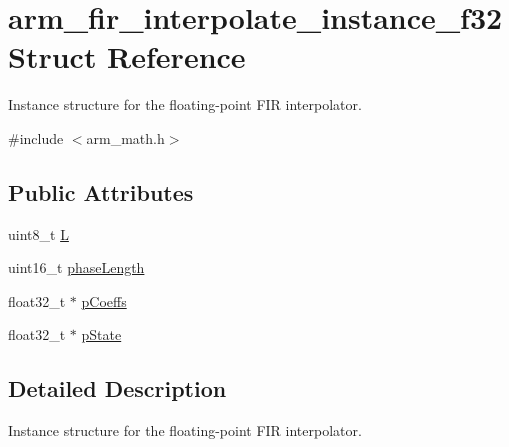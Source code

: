 \hypertarget{structarm__fir__interpolate__instance__f32}{\section{arm\-\_\-fir\-\_\-interpolate\-\_\-instance\-\_\-f32 Struct Reference}
\label{structarm__fir__interpolate__instance__f32}
}


Instance structure for the floating-\/point F\-I\-R interpolator.  




{\ttfamily \#include $<$arm\-\_\-math.\-h$>$}

\subsection*{Public Attributes}
\begin{DoxyCompactItemize}
\item 
uint8\-\_\-t \hyperlink{structarm__fir__interpolate__instance__f32_ae6f94dcc0ccd8aa4bc699b20985d9df5}{L}
\item 
uint16\-\_\-t \hyperlink{structarm__fir__interpolate__instance__f32_a389e669e13ec56292a70db8e92194b12}{phase\-Length}
\item 
float32\-\_\-t $\ast$ \hyperlink{structarm__fir__interpolate__instance__f32_a86053b715980a93c9df630d6de5bb63c}{p\-Coeffs}
\item 
float32\-\_\-t $\ast$ \hyperlink{structarm__fir__interpolate__instance__f32_a42a8ba1bda85fa86d7b6c84d3da4c75b}{p\-State}
\end{DoxyCompactItemize}


\subsection{Detailed Description}
Instance structure for the floating-\/point F\-I\-R interpolator. 

